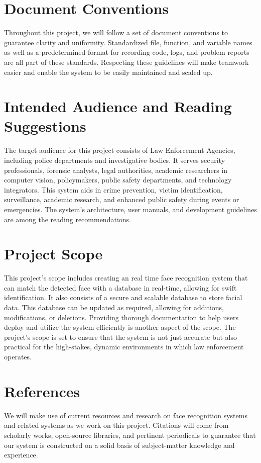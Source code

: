 \documentclass{scrreprt}
\begin{document}
    \section{Document Conventions}
    Throughout this project, we will follow a set of document conventions to guarantee clarity and uniformity. Standardized file, function, and variable names as well as a predetermined format for recording code, logs, and problem reports are all part of these standards. Respecting these guidelines will make teamwork easier and enable the system to be easily maintained and scaled up.
    
    \section{Intended Audience and Reading Suggestions}
    The target audience for this project consists of Law Enforcement Agencies, including police departments and investigative bodies. It serves security professionals, forensic analysts, legal authorities, academic researchers in computer vision, policymakers, public safety departments, and technology integrators. This system aids in crime prevention, victim identification, surveillance, academic research, and enhanced public safety during events or emergencies. The system's architecture, user manuals, and development guidelines are among the reading recommendations.
    
    \section{Project Scope}
    This project's scope includes creating an real time face recognition system that can match the detected face with a database in real-time, allowing for swift identification. It also consists of a secure and scalable database to store facial data. This database can be updated as required, allowing for additions, modifications, or deletions.    Providing thorough documentation to help users deploy and utilize the system efficiently is another aspect of the scope. The project's scope is set to ensure that the system is not just accurate but also practical for the high-stakes, dynamic environments in which law enforcement operates.
    
    \section{References}
    We will make use of current resources and research on face recognition systems and related systems as we work on this project. Citations will come from scholarly works, open-source libraries, and pertinent periodicals to guarantee that our system is constructed on a solid basis of subject-matter knowledge and experience.
\end{document}
